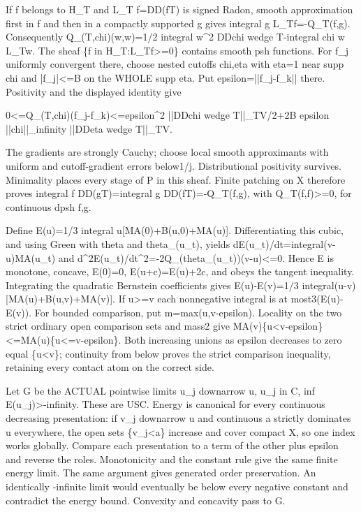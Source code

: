 \documentclass[11pt]{article}
\begin{document}
If f belongs to H\_T and L\_T f=DD(fT) is signed Radon, smooth approximation first in f and then in a compactly supported g gives integral g L\_Tf=-Q\_T(f,g). Consequently Q\_(T,chi)(w,w)=1/2 integral w\textasciicircum{}2 DDchi wedge T-integral chi w L\_Tw. The sheaf \{f in H\_T:L\_Tf>=0\} contains smooth psh functions. For f\_j uniformly convergent there, choose nested cutoffs chi,eta with eta=1 near supp chi and |f\_j|<=B on the WHOLE supp eta. Put epsilon=||f\_j-f\_k|| there. Positivity and the displayed identity give

0<=Q\_(T,chi)(f\_j-f\_k)<=epsilon\textasciicircum{}2 ||DDchi wedge T||\_TV/2+2B epsilon ||chi||\_infinity ||DDeta wedge T||\_TV.

The gradients are strongly Cauchy; choose local smooth approximants with uniform and cutoff-gradient errors below1/j. Distributional positivity survives. Minimality places every stage of P in this sheaf. Finite patching on X therefore proves integral f DD(gT)=integral g DD(fT)=-Q\_T(f,g), with Q\_T(f,f)>=0, for continuous dpsh f,g.

Define E(u)=1/3 integral u[MA(0)+B(u,0)+MA(u)]. Differentiating this cubic, and using Green with theta and theta\_(u\_t), yields dE(u\_t)/dt=integral(v-u)MA(u\_t) and d\textasciicircum{}2E(u\_t)/dt\textasciicircum{}2=-2Q\_(theta\_(u\_t))(v-u)<=0. Hence E is monotone, concave, E(0)=0, E(u+c)=E(u)+2c, and obeys the tangent inequality. Integrating the quadratic Bernstein coefficients gives E(u)-E(v)=1/3 integral(u-v)[MA(u)+B(u,v)+MA(v)]. If u>=v each nonnegative integral is at most3(E(u)-E(v)). For bounded comparison, put m=max(u,v-epsilon). Locality on the two strict ordinary open comparison sets and mass2 give MA(v)\{u<v-epsilon\}<=MA(u)\{u<=v-epsilon\}. Both increasing unions as epsilon decreases to zero equal \{u<v\}; continuity from below proves the strict comparison inequality, retaining every contact atom on the correct side.

Let G be the ACTUAL pointwise limits u\_j downarrow u, u\_j in C, inf E(u\_j)>-infinity. These are USC. Energy is canonical for every continuous decreasing presentation: if v\_j downarrow u and continuous a strictly dominates u everywhere, the open sets \{v\_j<a\} increase and cover compact X, so one index works globally. Compare each presentation to a term of the other plus epsilon and reverse the roles. Monotonicity and the constant rule give the same finite energy limit. The same argument gives generated order preservation. An identically -infinite limit would eventually be below every negative constant and contradict the energy bound. Convexity and concavity pass to G.
\end{document}
